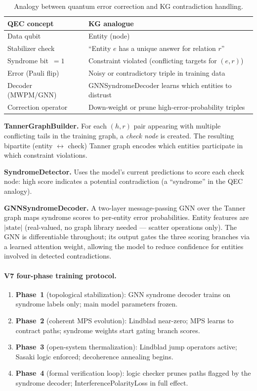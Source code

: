 \documentclass[runningheads]{llncs}
\begin{document}
\begin{table}[t]
\caption{Analogy between quantum error correction and KG contradiction handling.}
\label{tab:qec_analogy}
\centering
\begin{tabular}{ll}
\toprule
QEC concept & KG analogue \\
\midrule
Data qubit & Entity (node) \\
Stabilizer check & ``Entity $e$ has a unique answer for relation $r$'' \\
Syndrome bit~$=1$ & Constraint violated (conflicting targets for $(e,r)$) \\
Error (Pauli flip) & Noisy or contradictory triple in training data \\
Decoder (MWPM/GNN) & GNNSyndromeDecoder learns which entities to distrust \\
Correction operator & Down-weight or prune high-error-probability triples \\
\bottomrule
\end{tabular}
\end{table}

\textbf{TannerGraphBuilder.}
For each $(h,r)$ pair appearing with multiple conflicting tails in the
training graph, a \emph{check node} is created.  The resulting bipartite
(entity $\leftrightarrow$ check) Tanner graph encodes which entities
participate in which constraint violations.

\textbf{SyndromeDetector.}
Uses the model's current predictions to score each check node: high score
indicates a potential contradiction (a ``syndrome'' in the QEC analogy).

\textbf{GNNSyndromeDecoder.}
A two-layer message-passing GNN over the Tanner graph maps syndrome scores
to per-entity error probabilities.  Entity features are $|\text{state}|$
(real-valued, no graph library needed --- scatter operations only).  The GNN
is differentiable throughout; its output gates the three scoring branches via
a learned attention weight, allowing the model to reduce confidence for
entities involved in detected contradictions.

\paragraph{V7 four-phase training protocol.}
\begin{enumerate}
  \item \textbf{Phase~1} (topological stabilization): GNN syndrome decoder
    trains on syndrome labels only; main model parameters frozen.
  \item \textbf{Phase~2} (coherent MPS evolution): Lindblad near-zero; MPS
    learns to contract paths; syndrome weights start gating branch scores.
  \item \textbf{Phase~3} (open-system thermalization): Lindblad jump
    operators active; Sasaki logic enforced; decoherence annealing begins.
  \item \textbf{Phase~4} (formal verification loop): logic checker prunes
    paths flagged by the syndrome decoder; InterferencePolarityLoss in full
    effect.
\end{enumerate}
\end{document}
